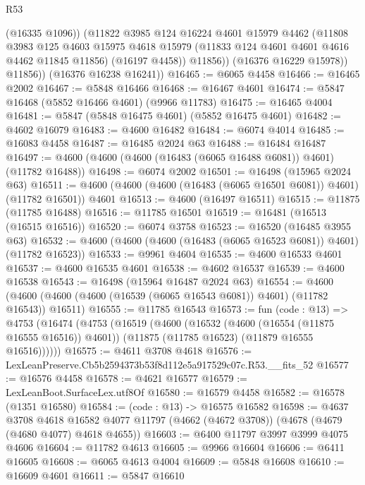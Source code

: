 \begin{lexlean}{R53}
\begin{coremodule}
                (@16335 @1096))
              (@11822
                @3985
                @124
                @16224
                @4601
                @15979
                @4462
                (@11808
                  @3983
                  @125
                  @4603
                  @15975
                  @4618
                  @15979
                  (@11833 @124 @4601 @4601 @4616 @4462 @11845 @11856)
                  (@16197 @4458))
                @11856))
            (@16376 @16229 @15978))
          @11856))
      (@16376 @16238 @16241))
@16465 := @6065 @4458
@16466 := @16465 @2002
@16467 := @5848 @16466
@16468 := @16467 @4601
@16474 := @5847 @16468 (@5852 @16466 @4601) (@9966 @11783)
@16475 := @16465 @4004
@16481 := @5847 (@5848 @16475 @4601) (@5852 @16475 @4601)
@16482 := @4602 @16079
@16483 := @4600 @16482
@16484 := @6074 @4014
@16485 := @16083 @4458
@16487 := @16485 @2024 @63
@16488 := @16484 @16487
@16497 := @4600 (@4600 (@4600 (@16483 (@6065 @16488 @6081)) @4601) (@11782 @16488))
@16498 := @6074 @2002
@16501 := @16498 (@15965 @2024 @63)
@16511 := @4600 (@4600 (@4600 (@16483 (@6065 @16501 @6081)) @4601) (@11782 @16501)) @4601
@16513 := @4600 (@16497 @16511)
@16515 := @11875 (@11785 @16488)
@16516 := @11785 @16501
@16519 := @16481 (@16513 (@16515 @16516))
@16520 := @6074 @3758
@16523 := @16520 (@16485 @3955 @63)
@16532 := @4600 (@4600 (@4600 (@16483 (@6065 @16523 @6081)) @4601) (@11782 @16523))
@16533 := @9961 @4604
@16535 := @4600 @16533 @4601
@16537 := @4600 @16535 @4601
@16538 := @4602 @16537
@16539 := @4600 @16538
@16543 := @16498 (@15964 @16487 @2024 @63)
@16554 := @4600 (@4600 (@4600 (@4600 (@16539 (@6065 @16543 @6081)) @4601) (@11782 @16543)) @16511)
@16555 := @11785 @16543
@16573 := fun (code : @13) =>
  @4753
    (@16474
      (@4753
        (@16519
          (@4600
            (@16532 (@4600 (@16554 (@11875 @16555 @16516)) @4601))
            (@11875 (@11785 @16523) (@11879 @16555 @16516))))))
@16575 := @4611 @3708 @4618
@16576 := LexLeanPreserve.Cb5b2594373b53f8d112e5a917529c07c.R53.__fits_52
@16577 := @16576 @4458
@16578 := @4621 @16577
@16579 := LexLeanBoot.SurfaceLex.utf8Of
@16580 := @16579 @4458
@16582 := @16578 (@1351 @16580)
@16584 := (code : @13) -> @16575 @16582
@16598 := @4637
    @3708
    @4618
    @16582
    @4077
    @11797
    (@4662 (@4672 @3708))
    (@4678 (@4679 (@4680 @4077) @4618 @4655))
@16603 := @6400 @11797 @3997 @3999 @4075 @4606
@16604 := @11782 @4613
@16605 := @9966 @16604
@16606 := @6411 @16605
@16608 := @6065 @4613 @4004
@16609 := @5848 @16608
@16610 := @16609 @4601
@16611 := @5847 @16610

\end{coremodule}
\end{lexlean}
